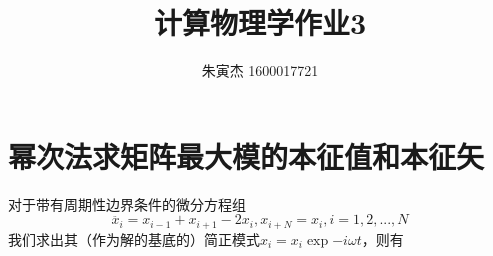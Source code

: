 \documentclass[UTF8,size=9.5]{ctexart}
\title{计算物理学作业3}
\author{朱寅杰 1600017721}
\begin{document}
\maketitle

\section{幂次法求矩阵最大模的本征值和本征矢}
对于带有周期性边界条件的微分方程组
\[\ddot{x_{i}}=x_{i-1}+x_{i+1}-2x_{i},x_{i+N}=x_{i},i=1,2,...,N\]
我们求出其（作为解的基底的）简正模式$x_i=x_i\exp{-i\omega t}$，则有
\end{document}
